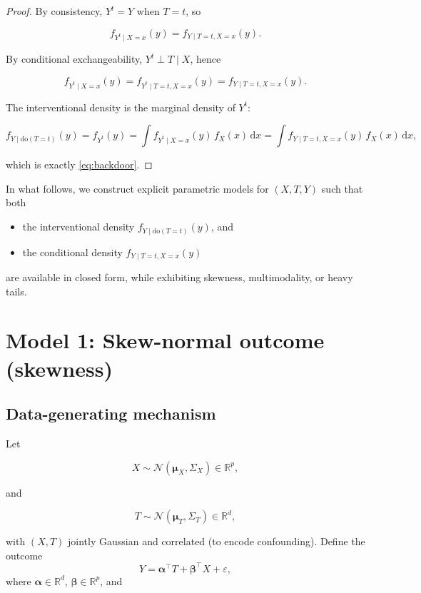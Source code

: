 \documentclass[11pt]{article}
\begin{document}
\begin{proof}
By consistency, $Y^{t} = Y$ when $T=t$, so


\[
f_{Y^{t} \mid X=x}(y) = f_{Y \mid T=t, X=x}(y).
\]


By conditional exchangeability, $Y^{t} \perp T \mid X$, hence


\[
f_{Y^{t} \mid X=x}(y) = f_{Y^{t} \mid T=t, X=x}(y) = f_{Y \mid T=t, X=x}(y).
\]


The interventional density is the marginal density of $Y^{t}$:


\[
f_{Y \mid \mathrm{do}(T=t)}(y)
= f_{Y^{t}}(y)
= \int f_{Y^{t} \mid X=x}(y)\, f_X(x)\, \mathrm{d}x
= \int f_{Y \mid T=t, X=x}(y)\, f_X(x)\, \mathrm{d}x,
\]


which is exactly \eqref{eq:backdoor}.
\end{proof}

In what follows, we construct explicit parametric models for $(X,T,Y)$ such that both
\begin{itemize}
    \item the interventional density $f_{Y \mid \mathrm{do}(T=t)}(y)$, and
    \item the conditional density $f_{Y \mid T=t, X=x}(y)$
\end{itemize}
are available in closed form, while exhibiting skewness, multimodality, or heavy tails.

\section{Model 1: Skew-normal outcome (skewness)}

\subsection{Data-generating mechanism}

Let


\[
X \sim \mathcal{N}(\bm{\mu}_X, \Sigma_X) \in \mathbb{R}^p,
\]


and


\[
T \sim \mathcal{N}(\bm{\mu}_T, \Sigma_T) \in \mathbb{R}^d,
\]


with $(X,T)$ jointly Gaussian and correlated (to encode confounding).
Define the outcome
\begin{equation}
    Y = \bm{\alpha}^\top T + \bm{\beta}^\top X + \varepsilon,
    \label{eq:model1_Y}
\end{equation}
where $\bm{\alpha} \in \mathbb{R}^d$, $\bm{\beta} \in \mathbb{R}^p$, and
\end{document}
